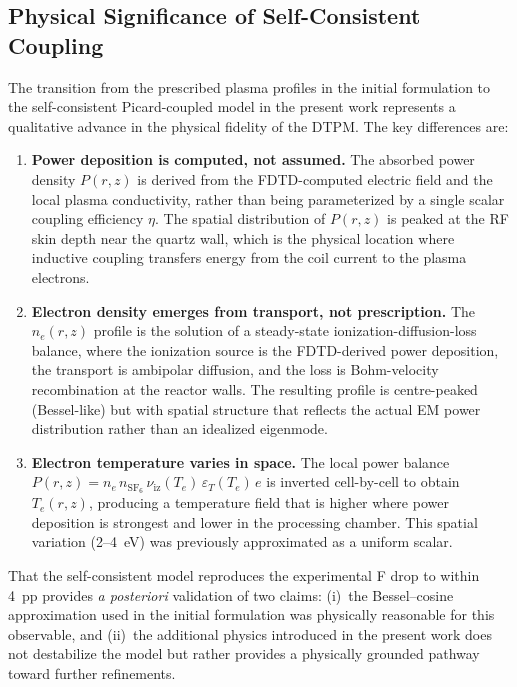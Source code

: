 \documentclass[11pt,a4paper]{report}
\newcommand{\SFsix}{\mathrm{SF}_6}
\newcommand{\Te}{T_e}
\begin{document}
\subsection{Physical Significance of Self-Consistent Coupling}

The transition from the prescribed plasma profiles in the initial formulation to the self-consistent Picard-coupled model in the present work represents a qualitative advance in the physical fidelity of the DTPM.  The key differences are:

\begin{enumerate}
  \item \textbf{Power deposition is computed, not assumed.}  The absorbed power density $P(r,z)$ is derived from the FDTD-computed electric field and the local plasma conductivity, rather than being parameterized by a single scalar coupling efficiency $\eta$.  The spatial distribution of $P(r,z)$ is peaked at the RF skin depth near the quartz wall, which is the physical location where inductive coupling transfers energy from the coil current to the plasma electrons.

  \item \textbf{Electron density emerges from transport, not prescription.}  The $n_e(r,z)$ profile is the solution of a steady-state ionization-diffusion-loss balance, where the ionization source is the FDTD-derived power deposition, the transport is ambipolar diffusion, and the loss is Bohm-velocity recombination at the reactor walls.  The resulting profile is centre-peaked (Bessel-like) but with spatial structure that reflects the actual EM power distribution rather than an idealized eigenmode.

  \item \textbf{Electron temperature varies in space.}  The local power balance $P(r,z) = n_e\,n_{\SFsix}\,\nu_\mathrm{iz}(\Te)\,\varepsilon_T(\Te)\,e$ is inverted cell-by-cell to obtain $\Te(r,z)$, producing a temperature field that is higher where power deposition is strongest and lower in the processing chamber.  This spatial variation (2--4~eV) was previously approximated as a uniform scalar.
\end{enumerate}

That the self-consistent model reproduces the experimental F drop to within 4~pp provides \textit{a posteriori} validation of two claims: (i)~the Bessel--cosine approximation used in the initial formulation was physically reasonable for this observable, and (ii)~the additional physics introduced in the present work does not destabilize the model but rather provides a physically grounded pathway toward further refinements.
\end{document}
